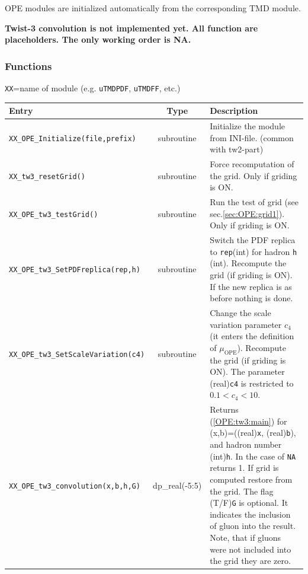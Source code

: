 \documentclass[prd,nofootinbib,eqsecnum,final]{revtex4}
\renewcommand{\(}{\left(}
\renewcommand{\)}{\right)}
\renewcommand{\[}{\left[}
\renewcommand{\]}{\right]}
\newcommand{\red}[1]{{\color[rgb]{1,0,0} #1}}
\begin{document}
\begin{tcolorbox}
\begin{center}
OPE modules are initialized automatically from the corresponding TMD module.
\end{center}
\end{tcolorbox}

\begin{tcolorbox}
\begin{center}
\red{
\textbf{Twist-3 convolution is not implemented yet. All function are placeholders. The only working order is NA.}}
\end{center}
\end{tcolorbox}

\subsubsection{Functions}

\begin{center}
\texttt{XX}=name of module (e.g. \texttt{uTMDPDF}, \texttt{uTMDFF}, etc.)
\\
\begin{tabular}{||p{5.5cm}||c||p{8.5cm}||}
\hline\hline
Entry &~~Type~~& Description
\\\hline
\texttt{XX\_OPE\_Initialize(file,prefix)} & subroutine & Initialize the module from INI-file. (common with tw2-part)
\\\hline
\texttt{XX\_tw3\_resetGrid()} & subroutine & Force recomputation of the grid. Only if griding is ON.
\\\hline
\texttt{XX\_OPE\_tw3\_testGrid()} & subroutine & Run the test of grid (see sec.\ref{sec:OPE:grid1}).  Only if griding is ON.
\\\hline
\texttt{XX\_OPE\_tw3\_SetPDFreplica(rep,h)} & subroutine & Switch the PDF replica to \texttt{rep}(int) for hadron \texttt{h} (int). Recompute the grid (if griding is ON). If the new replica is as before nothing is done.
\\\hline
\texttt{XX\_OPE\_tw3\_SetScaleVariation(c4)} & subroutine & Change the scale variation parameter $c_4$ (it enters the definition of $\mu_{\text{OPE}}$). Recompute the grid (if griding is ON). The parameter (real)\texttt{c4} is restricted to $0.1<c_4<10$.
\\\hline\hline
\texttt{XX\_OPE\_tw3\_convolution(x,b,h,G)} & dp\_real(-5:5) & Returns (\ref{OPE:tw3:main}) for (x,b)=((real)\texttt{x}, (real)\texttt{b}), and hadron number (int)\texttt{h}. In the case of \texttt{NA} returns 1. If grid is computed restore from the grid. The flag (T/F)\texttt{G} is optional. It indicates the inclusion of gluon into the result. Note, that if gluons were not included into the grid they are zero.
\\\hline\hline
\end{tabular}
\end{center}
\end{document}
